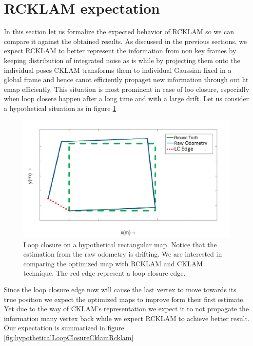 \section{RCKLAM expectation}
\label{sec:RCKLAMExpectation}
In this section let us formalize the expected behavior of RCKLAM so we can compare it against the obtained results. As discussed in the previous sections, we expect RCKLAM to better represent the information from non key frames by keeping distribution of integrated noise as is while by projecting them onto the individual poses CKLAM transforms them to individual Gaussian fixed in a global frame and hence canot efficiently propaget new information through out ht emap efficiently. This situation is most prominent in case of loo closure, especially when loop closere happen after a long time and with a large drift. Let us consider a hypothetical situation as in figure \ref{fig:hypotheticalLoopClosure}
\begin{figure}
	\centering
		\includegraphics[width=1.00\textwidth]{images/hypotheticalLoopClosure.png}
  \caption{Loop closure on a hypothetical rectangular map. Notice that the estimation from the raw odometry is drifting. We are interested in comparing the optimized map with RCKLAM and CKLAM technique. The red edge represent a loop closure edge.}
  \label{fig:hypotheticalLoopClosure}
\end{figure}
Since the loop closure edge now will cause the last vertex to move towards its true position we expect the optimized maps to improve form their first estimate. Yet due to the way of CKLAM's representation we expect it to not propagate the information many vertex back while we expect RCKLAM to achieve better result. Our expectation is summarized in figure \ref{fig:hypotheticalLoopClosureCklamRcklam}
